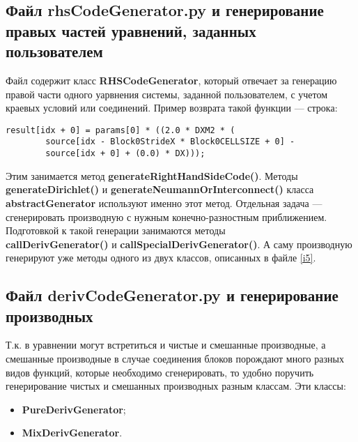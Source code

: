 \documentclass[a4paper]{article}
\begin{document}
\newpage
\subsection{\Large Файл rhsCodeGenerator.py и генерирование правых частей уравнений, заданных пользователем}
Файл содержит класс {\bf RHSCodeGenerator}, который отвечает за ге\-не\-ра\-цию правой части одного уарвнения системы, заданной пользователем, с учетом краевых условий или соединений. Пример возврата такой функ\-ции --- строка:
\begin{verbatim}
result[idx + 0] = params[0] * ((2.0 * DXM2 * (
        source[idx - Block0StrideX * Block0CELLSIZE + 0] - 
        source[idx + 0] + (0.0) * DX)));
\end{verbatim}

Этим занимается метод {\bf generateRightHandSideCode()}. Методы\\{\bf generateDirichlet()} и {\bf generateNeumannOrInterconnect()} класса\\
{\bf abstractGenerator} используют именно этот метод. Отдельная задача --- сгенерировать производную с нужным конечно-разностным при\-бли\-же\-ни\-ем. Подготовкой к такой генерации занимаются методы \\ {\bf callDerivGenerator()} и {\bf callSpecialDerivGenerator()}. А саму про\-из\-вод\-ную генерируют уже методы одного из двух классов, описанных в файле \ref{i5}.

\newpage
\subsection{\Large Файл derivCodeGenerator.py и генерирование производных}
Т.к. в уравнении могут встретиться и чистые и смешанные производные, а смешанные производные в случае соединения блоков порождают много разных видов функций, которые необходимо сгенерировать, то удобно поручить генерирование чистых и смешанных производных разным клас\-сам. Эти классы:
\begin{itemize}
\item {\bf PureDerivGenerator};
\item {\bf MixDerivGenerator}.
\end{itemize}
\end{document}
